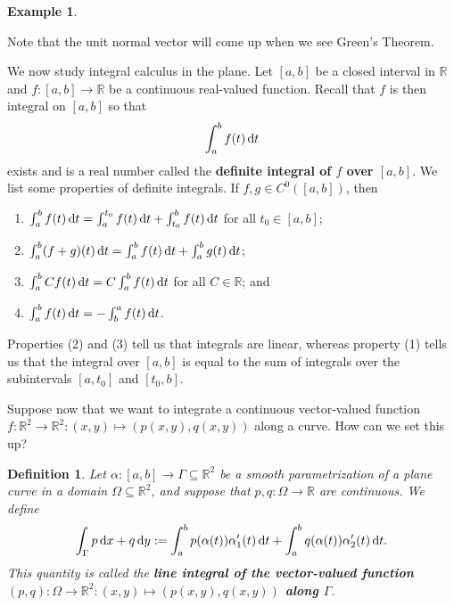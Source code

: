 \documentclass[10pt]{article}
\newcommand{\R}{\mathbb{R}}
\theoremstyle{newstyle}
\newtheorem{defn}[thm]{Definition}
\newtheorem{exmp}[thm]{Example}
\begin{document}
\begin{exmp}
\begin{center}
\end{center}
\end{exmp}

Note that the unit normal vector will come up when we see Green's Theorem.

We now study integral calculus in the plane. Let $[a, b]$ be a closed interval in $\R$ 
and $f : [a, b] \to \R$ be a continuous real-valued function. Recall that 
$f$ is then integral on $[a, b]$ so that 
\[ \int_a^b f(t)\,{\rm d}t \]
exists and is a real number called the {\bf definite integral of $f$ over $[a, b]$}. 
We list some properties of definite integrals. If $f, g \in C^0([a, b])$, then 
\begin{enumerate}[(1)]
    \item $\int_a^b f(t)\,{\rm d}t = \int_a^{t_0} f(t)\,{\rm d}t + \int_{t_0}^b f(t)\,{\rm d}t$ 
    for all $t_0 \in [a, b]$;
    \item $\int_a^b (f+g)(t)\,{\rm d}t = \int_a^b f(t)\,{\rm d}t + \int_a^b g(t)\,{\rm d}t$; 
    \item $\int_a^b Cf(t)\,{\rm d}t = C\int_a^b f(t)\,{\rm d}t$ for all $C \in \R$; and 
    \item $\int_a^b f(t)\,{\rm d}t = -\int_b^a f(t)\,{\rm d}t$.
\end{enumerate}
Properties (2) and (3) tell us that integrals are linear, whereas property (1) tells us that 
the integral over $[a, b]$ is equal to the sum of integrals over the subintervals 
$[a, t_0]$ and $[t_0, b]$.

Suppose now that we want to integrate a continuous vector-valued function $f : \R^2 \to \R^2 : 
(x, y) \mapsto (p(x,y), q(x,y))$ along a curve. How can we set this up?

\begin{defn}
Let $\alpha : [a, b] \to \Gamma \subseteq \R^2$ be a smooth parametrization of a plane curve 
in a domain $\Omega \subseteq \R^2$, and suppose that $p, q : \Omega \to \R$ are 
continuous. We define 
\[ \int_\Gamma p\,{\rm d}x + q\,{\rm d}y := \int_a^b p(\alpha(t)) \alpha'_1(t)\,{\rm d}t 
+ \int_a^b q(\alpha(t)) \alpha'_2(t)\,{\rm d}t. \]
This quantity is called the {\bf line integral of the vector-valued function 
$(p, q) : \Omega \to \R^2 : (x, y) \mapsto (p(x,y), q(x,y))$ along $\Gamma$}.
\end{defn}
\end{document}
